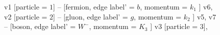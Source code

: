 \documentclass{revtex4}
\begin{document}
\begin{figure}[!htb]
\begin{center}
{    %
v1 [particle = \(1\)] -- [fermion, edge label' = \(b\), momentum = \(k_{1}\) ] v6, 
v2 [particle = \(2\)] -- [gluon, edge label' = \(g\), momentum = \(k_{2}\) ] v5, 
v7 -- [boson, edge label' = \(W^{-}\), momentum = \(K_{3}\) ] v3 [particle = \(3\)], 
}
\end{center}
\end{figure}
\end{document}
